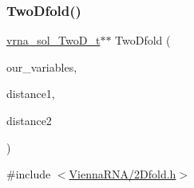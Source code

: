 \subsubsection{\texorpdfstring{TwoDfold()}{TwoDfold()}}
{\footnotesize\ttfamily \mbox{\hyperlink{group__kl__neighborhood__mfe_structvrna__sol__TwoD__t}{vrna\+\_\+sol\+\_\+\+Two\+D\+\_\+t}}$\ast$$\ast$ Two\+Dfold (\begin{DoxyParamCaption}\item[{\mbox{\hyperlink{group__kl__neighborhood__mfe_structTwoDfold__vars}{Two\+Dfold\+\_\+vars}} $\ast$}]{our\+\_\+variables,  }\item[{int}]{distance1,  }\item[{int}]{distance2 }\end{DoxyParamCaption})}



{\ttfamily \#include $<$\mbox{\hyperlink{2Dfold_8h}{Vienna\+R\+N\+A/2\+Dfold.\+h}}$>$}

